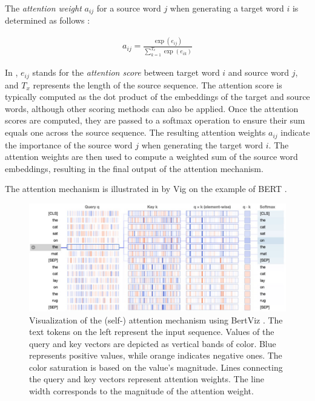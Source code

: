 The \emph{attention weight} $a_{ij}$ for a source word $j$ when generating a target word $i$ is determined as follows \cite{BahdanauNeuralMachine2016}:

\begin{align}
    a_{ij} = \frac{\exp(e_{ij})}{\sum_{k=1}^{T_x} \exp(e_{ik})} \label{eq:attention-weights}
\end{align}

In , $e_{ij}$ stands for the \emph{attention score} between target word $i$ and source word $j$, and $T_x$ represents the length of the source sequence. The attention score is typically computed as the dot product of the embeddings of the target and source words, although other scoring methods can also be applied. Once the attention scores are computed, they are passed to a softmax operation to ensure their sum equals one across the source sequence. The resulting attention weights $a_{ij}$ indicate the importance of the source word $j$ when generating the target word $i$. The attention weights are then used to compute a weighted sum of the source word embeddings, resulting in the final output of the attention mechanism.

The attention mechanism is illustrated in  by Vig \cite{VigMultiscaleVisualization2019} on the example of BERT \cite{DevlinBERTPretraining2019}.

\begin{figure}[ht]
    \centering
    \includegraphics[width=\textwidth]{screenshots/self_attention_bertviz.png}
    \caption[The Attention Mechanism]{Visualization of the (self-) attention mechanism using BertViz \cite{VigMultiscaleVisualization2019}. The text tokens on the left represent the input sequence. Values of the query and key vectors are depicted as vertical bands of color. Blue represents positive values, while orange indicates negative ones. The color saturation is based on the value's magnitude. Lines connecting the query and key vectors represent attention weights. The line width corresponds to the magnitude of the attention weight.}
    \label{fig:self-attention-bertviz}
\end{figure}


